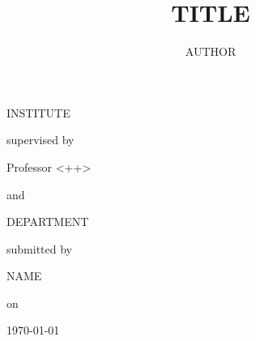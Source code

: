 \documentclass[12pt,a4paper]{article}
\begin{document}
\newcommand\Fig[4][]{\begin{#4}[H]\centering\texttt{[image: draw/\#2.eps]}\caption{#3.#1}\label{fig:#2}\end{#4}}
\newcommand\degc{~$^\circ$C}
\newcommand\etal{\textit{et al}.}
\newcommand\fig[4][]{\begin{#4}[!ht]\centering\texttt{[image: draw/\#2.eps]}\caption{#3.#1}\label{fig:#2}\end{#4}}
\newcommand\hackcite[1]{$^[$\autocite{#1}$^]$}		%
\newcommand\m{($-$)}
\newcommand\p{(+)}

\newcommand\expt[2] {
\subsection*{#1}
\begin{figure}[!ht]
	\centering
	\texttt{[image: draw/\#2.eps]}
\end{figure}}

\onehalfspacing{}

\title{TITLE}
\author{AUTHOR}


\makeatletter
\begin{titlepage}
	\centering
	{\scshape\LARGE INSTITUTE \par} \vspace{1cm}
	{\Large\bfseries \@title{}	\par} \vspace{2cm}
	supervised by \par
	{\large Professor <++>} \par
	and \par
	{\large <++>} \par
	DEPARTMENT \par
	\vfill
	submitted by \par
	{\Large \@author{} \textsc{NAME}} \par
	on \par
	\Large \today
\end{titlepage}
\end{document}
